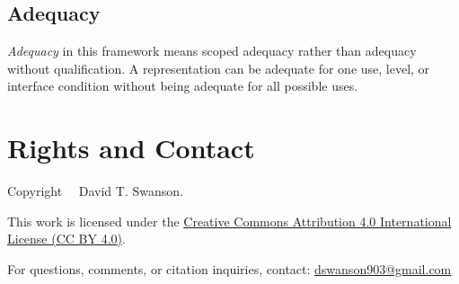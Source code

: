 \documentclass[11pt]{article}
\renewcommand{\emph}[1]{\textit{#1}}
\begin{document}
\subsection*{Adequacy}

\emph{Adequacy} in this framework means scoped adequacy rather than adequacy without qualification. A representation can be adequate for one use, level, or interface condition without being adequate for all possible uses.




\section*{Rights and Contact}

\noindent
Copyright \textcopyright\ \the\year\ David T. Swanson.

\noindent
This work is licensed under the
\href{https://creativecommons.org/licenses/by/4.0/}
{Creative Commons Attribution 4.0 International License (CC BY 4.0)}.

\noindent
For questions, comments, or citation inquiries, contact:
\href{mailto:your_email@example.com}{dswanson903@gmail.com}
\end{document}
